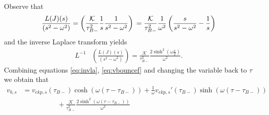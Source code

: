 \documentclass[12pt,a4paper]{article}
\numberwithin{equation}{section}
\numberwithin{equation}{section}
\begin{document}
Observe that 
\begin{equation}
        \frac{L(J)(s)}{ (s^2 - \omega^2)} =  \left( \frac{\mathcal{K}}{\tau^2_{B-}} \frac{1}{s
        } \frac{1}{s^2 - \omega^2} \right) \\
        = \frac{\mathcal{K}}{\tau^2_{B-}} \frac{1}{ \omega^2} \left( \frac{s}{s^2 - \omega^2} - \frac{1}{s} \right) 
\end{equation}
and the inverse Laplace transform yields
\begin{equation}
\begin{split}
   L^{-1} & \left(\frac{L(J)(s)}{ (s^2 - \omega^2)}\right) =  \frac{\mathcal{K}}{\tau^2_{B-}} \frac{2\sinh^2\left( \omega \frac{x}{2}\right)}{\omega^2}.
   \label{eq:invla}
   \end{split}
\end{equation}
Combining equations \eqref{eq:invla}, \eqref{eq:vbouncef} and changing the variable back to $\tau$ we obtain that
\begin{equation}
\begin{split}
v_{b,s} &= v_{ekp,s}(\tau_{B-}) \cosh(\omega(\tau-\tau_{B-}))+ \frac{1}{\omega} v_{ekp,s}'(\tau_{B-}) \sinh(\omega(\tau-\tau_{B-})) \\
&  \;\;\;\;\;\;\;\;\;\;\;\;\;\;\;\;\;\;+\frac{\mathcal{K}}{\tau^2_{B-}} \frac{2\sinh^2\left( \omega (\tau-\tau_{B-})\right)}{\omega^2}
\label{eq:vi2} 
\end{split}
\end{equation}
\end{document}
